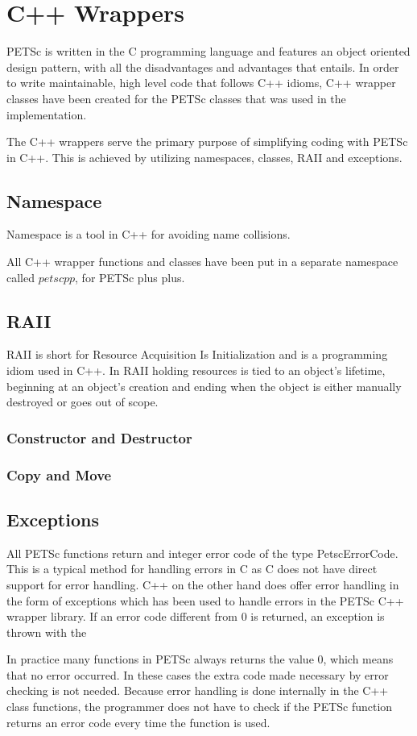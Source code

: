 \section{C++ Wrappers}

PETSc is written in the C programming language and features an object oriented
design pattern, with all the disadvantages and advantages that entails. In order
to write maintainable, high level code that follows C++ idioms, C++ wrapper
classes have been created for the PETSc classes that was used in the
implementation.

The C++ wrappers serve the primary purpose of simplifying coding with PETSc in
C++. This is achieved by utilizing namespaces, classes, RAII and exceptions.

\subsection{Namespace}

Namespace is a tool in C++ for avoiding name collisions.

All C++ wrapper functions and classes have been put in a separate namespace
called $petscpp$, for PETSc plus plus.

\subsection{RAII}

RAII is short for Resource Acquisition Is Initialization and is a programming
idiom used in C++. In RAII holding resources is tied to an object's lifetime,
beginning at an object's creation and ending when the object is either manually
destroyed or goes out of scope.

\subsubsection{Constructor and Destructor}



\subsubsection{Copy and Move}



\subsection{Exceptions}

All PETSc functions return and integer error code of the type PetscErrorCode.
This is a typical method for handling errors in C as C does not have direct
support for error handling. C++ on the other hand does offer error handling in
the form of exceptions which has been used to handle errors in the PETSc C++
wrapper library. If an error code different from 0 is returned, an exception
is thrown with the 

In practice many functions in PETSc always returns the value 0, which means that
no error occurred. 
In these cases the extra code made necessary by error checking is not needed.
Because error handling is done internally in the C++ class functions, the
programmer does not have to check if the PETSc function returns an error code
every time the function is used.

